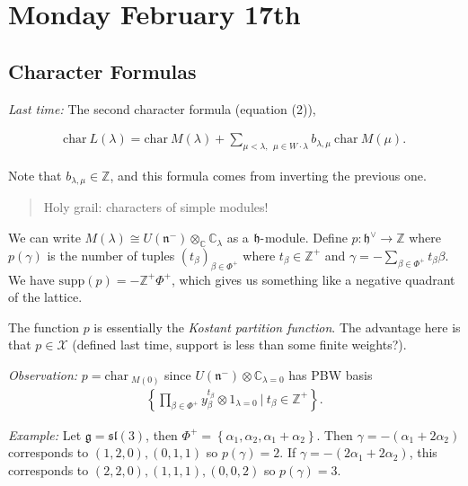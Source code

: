 \documentclass[11pt]{scrartcl}
\theoremstyle{definition}
\theoremstyle{theorem}
\theoremstyle{proof}
\theoremstyle{definition}
\theoremstyle{break}
\theoremstyle{problem}
\DeclarePairedDelimiter\qty{(}{)}
\renewcommand{\qty}[1]{{\left(  {#1} \right)}}
\newcommand{\CC}[0]{{\mathbb{C}}}
\newcommand{\ZZ}[0]{{\mathbb{Z}}}
\newcommand{\ch}[0]{\mathrm{char}~}
\newcommand{\dash}[0]{{\hbox{-}}}
\newcommand{\dual}[0]{^\vee}
\newcommand{\lieg}[0]{{\mathfrak{g}}}
\newcommand{\lieh}[0]{{\mathfrak{h}}}
\newcommand{\lien}[0]{{\mathfrak{n}}}
\newcommand{\liesl}[0]{{\mathfrak{sl}}}
\newcommand{\mcx}[0]{{\mathcal{X}}}
\newcommand{\suchthat}[0]{{~\mathrel{\Big|}~}}
\newcommand{\supp}[0]{{\mathrm{supp}}}
\newcommand{\tensor}[0]{\otimes}
\newcommand{\theset}[1]{\left\{{#1}\right\}}
\renewcommand{\to}[0]{\longrightarrow}
\begin{document}
\hypertarget{monday-february-17th}{%
\section{Monday February 17th}\label{monday-february-17th}}

\hypertarget{character-formulas}{%
\subsection{Character Formulas}\label{character-formulas}}

\emph{Last time:} The second character formula (equation (2)),

\begin{align*}
\ch L(\lambda) =  \ch M(\lambda) + \sum_{\mu < \lambda, ~~ \mu \in W\cdot \lambda} b_{\lambda, \mu} ~\ch M(\mu)
.\end{align*}

Note that \(b_{\lambda, \mu} \in \ZZ\), and this formula comes from
inverting the previous one.

\begin{quote}
Holy grail: characters of simple modules!
\end{quote}

We can write \(M(\lambda) \cong U(\lien^-) \tensor_\CC \CC_\lambda\) as
a \(\lieh\dash\)module. Define \(p: \lieh\dual \to \ZZ\) where
\(p(\gamma)\) is the number of tuples \((t_\beta)_{\beta\in\Phi^+}\)
where \(t_\beta \in \ZZ^+\) and
\(\gamma = - \sum_{\beta \in \Phi^+} t_\beta \beta\). We have
\(\supp(p) = - \ZZ^+ \Phi^+\), which gives us something like a negative
quadrant of the lattice.

The function \(p\) is essentially the \emph{Kostant partition function}.
The advantage here is that \(p \in \mcx\) (defined last time, support is
less than some finite weights?).

\emph{Observation:} \(p = \ch_{M(0)}\) since
\(U(\lien^-) \tensor \CC_{\lambda = 0}\) has PBW basis
\begin{align*}
\theset{ \prod_{\beta\in\Phi^+} y_\beta^{t_\beta} \tensor 1_{\lambda = 0} \suchthat t_\beta \in \ZZ^+ }.
\end{align*}

\emph{Example:} Let \(\lieg = \liesl(3)\), then
\(\Phi^+ = \theset{\alpha_1, \alpha_2, \alpha_1 + \alpha_2}\). Then
\(\gamma = -\qty{\alpha_1 + 2\alpha_2}\) corresponds to
\((1,2,0), (0,1,1)\) so \(p(\gamma) = 2\). If
\(\gamma = -\qty{2\alpha_1 + 2\alpha_2}\), this corresponds to
\((2,2,0), (1,1,1), (0,0,2)\) so \(p(\gamma) = 3\).
\end{document}
